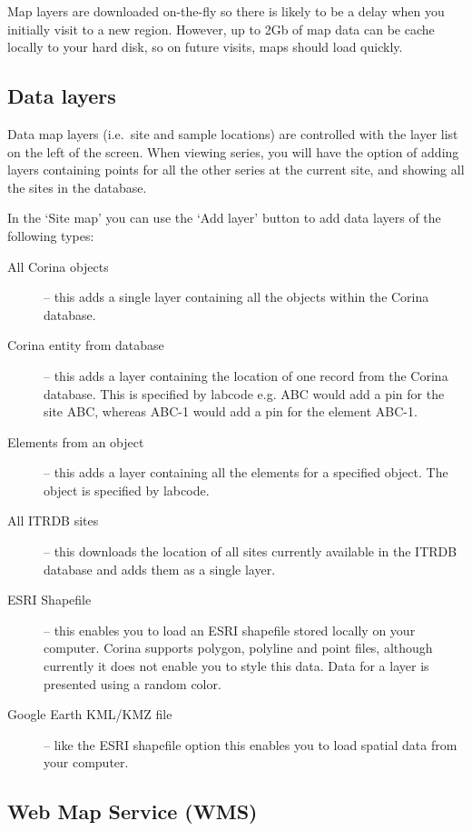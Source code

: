 Map layers are downloaded on-the-fly so there is likely to be a delay when you initially visit to a new region. However, up to 2Gb of map data can be cache locally to your hard disk, so on future visits, maps should load quickly.

\subsection{Data layers}
Data map layers (i.e.\ site and sample locations) are controlled with the layer list on the left of the screen. When viewing series, you will have the option of adding layers containing points for all the other series at the current site, and showing all the sites in the database. 

In the `Site map' you can use the `Add layer' button to add data layers of the following types:

\begin{description}
 \item[All Corina objects] -- this adds a single layer containing all the objects within the Corina database.
 \item[Corina entity from database] -- this adds a layer containing the location of one record from the Corina database.  This is specified by labcode e.g. ABC would add a pin for the site ABC, whereas ABC-1 would add a pin for the element ABC-1.
 \item[Elements from an object] -- this adds a layer containing all the elements for a specified object.  The object is specified by labcode.
 \item[All ITRDB sites] -- this downloads the location of all sites currently available in the ITRDB database and adds them as a single layer.
 \item[ESRI Shapefile] -- this enables you to load an ESRI shapefile stored locally on your computer.  Corina supports polygon, polyline and point files, although currently it does not enable you to style this data.  Data for a layer is presented using a random color.
 \item[Google Earth KML/KMZ file] -- like the ESRI shapefile option this enables you to load spatial data from your computer.
 \end{description}


\subsection{Web Map Service (WMS)}

